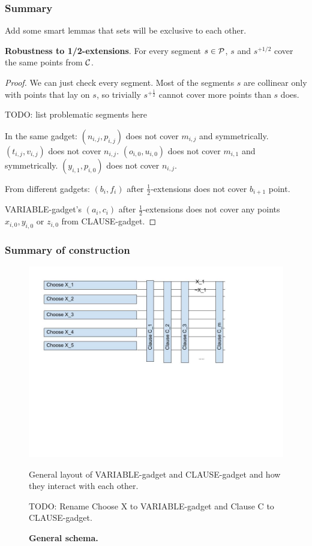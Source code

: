 \subsubsection{Summary}

Add some smart lemmas that sets will be exclusive to each other.

\begin{lemma}
\textbf{Robustness to 1/2-extensions}. For every segment $s \in \mathcal{P}$,
$s$ and $s^{+1/2}$ cover the same points from $\mathcal{C}$.
\end{lemma}

\begin{proof}
We can just check every segment. Most of the segments $s$
are collinear only with points that lay on $s$,
so trivially $s^{+\frac{1}{2}}$ cannot cover more points than $s$ does.

TODO: list problematic segments here

In the same gadget:
$(n_{i,j}, p_{i,j})$ does not cover $m_{i,j}$ and symmetrically.
$(t_{i,j}, v_{i,j})$ does not cover $n_{i,j}$.
$(o_{i,0}, u_{i,0})$ does not cover $m_{i,1}$ and symmetrically.
$(y_{i,1}, p_{i,0})$ does not cover $n_{i,j}$.



From different gadgets:
$(b_i, f_i)$ after $\frac{1}{2}$-extensions does not
cover $b_{i+1}$ point.

VARIABLE-gadget's $(a_i, c_i)$ after $\frac{1}{2}$-extensions does not
cover any points $x_{i,0}, y_{i,0}$ or $z_{i,0}$ from CLAUSE-gadget.


\end{proof}


\subsubsection{Summary of construction}

\begin{figure}
\centering
\includegraphics[width=\linewidth]{segment_apx_sketch.jpg}
\caption{\textbf{General schema.}}
General layout of VARIABLE-gadget and CLAUSE-gadget and how they
interact with each other.

TODO: Rename Choose X to VARIABLE-gadget and Clause C to CLAUSE-gadget.
\label{fig:segment_apx_sketch}
\end{figure}

